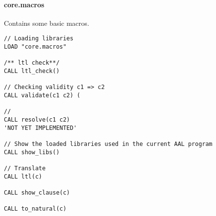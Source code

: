 \paragraph{core.macros} Contains some basic macros.
\begin{lstlisting}
// Loading libraries
LOAD "core.macros"

/** ltl check**/
CALL ltl_check()

// Checking validity c1 => c2
CALL validate(c1 c2) (

//
CALL resolve(c1 c2)
'NOT YET IMPLEMENTED'

// Show the loaded libraries used in the current AAL program
CALL show_libs()

// Translate 
CALL ltl(c)

CALL show_clause(c)

CALL to_natural(c)
\end{lstlisting}

